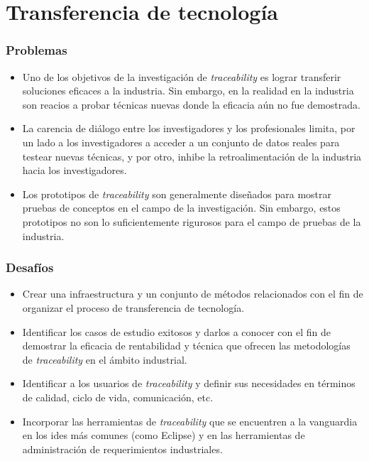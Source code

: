 \documentclass[a4paper,12pt,oneside,spanish]{book}
\begin{document}
\section{Transferencia de tecnología}

\subsubsection{Problemas}

\begin{itemize}[label={$\times$}]

\item Uno de los objetivos de la investigación de \textit{traceability} es lograr transferir soluciones eficaces a la industria. Sin embargo, en la realidad en la industria son reacios a probar técnicas nuevas donde la eficacia aún no fue demostrada.

\item La carencia de diálogo entre los investigadores y los profesionales limita, por un lado a los investigadores a acceder a un conjunto de datos reales para testear nuevas técnicas, y por otro, inhibe la retroalimentación de la industria hacia los investigadores.

\item Los prototipos de \textit{traceability} son generalmente diseñados para mostrar pruebas de conceptos en el campo de la investigación. Sin embargo, estos prototipos no son lo suficientemente rigurosos para el campo de pruebas de la industria.

\end{itemize}

\subsubsection{Desafíos}

\begin{itemize}[label={\checkmark}]

\item Crear una infraestructura y un conjunto de métodos relacionados con el fin de organizar el proceso de transferencia de tecnología.

\item Identificar los casos de estudio exitosos y darlos a conocer con el fin de demostrar la eficacia de rentabilidad y técnica que ofrecen las metodologías de \textit{traceability} en el ámbito industrial.

\item Identificar a los usuarios de \textit{traceability} y definir sus necesidades en términos de calidad, ciclo de vida, comunicación, etc.

\item Incorporar las herramientas de \textit{traceability} que se encuentren a la vanguardia en los \glspl{ide} más comunes (como \textsf{Eclipse}) y en las herramientas de administración de requerimientos industriales.

\end{itemize}
\end{document}
